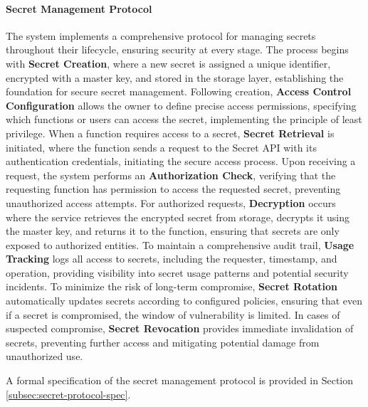 \documentclass[11pt]{article}
\begin{document}
\paragraph{Secret Management Protocol}
The system implements a comprehensive protocol for managing secrets throughout their lifecycle, ensuring security at every stage. The process begins with \textbf{Secret Creation}, where a new secret is assigned a unique identifier, encrypted with a master key, and stored in the storage layer, establishing the foundation for secure secret management. Following creation, \textbf{Access Control Configuration} allows the owner to define precise access permissions, specifying which functions or users can access the secret, implementing the principle of least privilege. When a function requires access to a secret, \textbf{Secret Retrieval} is initiated, where the function sends a request to the Secret API with its authentication credentials, initiating the secure access process. Upon receiving a request, the system performs an \textbf{Authorization Check}, verifying that the requesting function has permission to access the requested secret, preventing unauthorized access attempts. For authorized requests, \textbf{Decryption} occurs where the service retrieves the encrypted secret from storage, decrypts it using the master key, and returns it to the function, ensuring that secrets are only exposed to authorized entities. To maintain a comprehensive audit trail, \textbf{Usage Tracking} logs all access to secrets, including the requester, timestamp, and operation, providing visibility into secret usage patterns and potential security incidents. To minimize the risk of long-term compromise, \textbf{Secret Rotation} automatically updates secrets according to configured policies, ensuring that even if a secret is compromised, the window of vulnerability is limited. In cases of suspected compromise, \textbf{Secret Revocation} provides immediate invalidation of secrets, preventing further access and mitigating potential damage from unauthorized use.

A formal specification of the secret management protocol is provided in Section \ref{subsec:secret-protocol-spec}.


\end{document}
